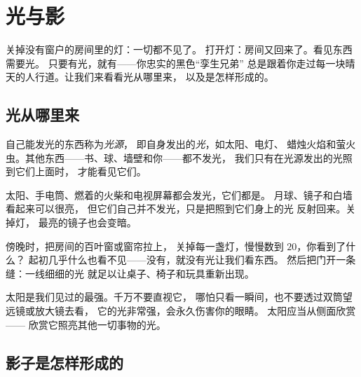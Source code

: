 \chapter{光与影}\label{ch:g1:light-and-shadows}

关掉没有窗户的房间里的灯：一切都不见了。
打开灯：房间又回来了。看见东西需要光。
只要有光，就有——你忠实的黑色“孪生兄弟”
总是跟着你走过每一块晴天的人行道。让我们来看看光从哪里来，
以及是怎样形成的。

\section{光从哪里来}

\begin{definition}[光源]\label{def:g1:light-and-shadows:source}
自己能发光的东西称为\emph{光源}，
即自身发出的\emph{光}，如太阳、电灯、
蜡烛火焰和萤火虫。其他东西——书、球、墙壁和你——都不发光，
我们只有在光源发出的光照到它们上面时，
才能看见它们。
\end{definition}

\begin{example}[是不是光源？]\label{ex:g1:light-and-shadows:sources}
太阳、手电筒、燃着的火柴和电视屏幕都会发光，它们都是。
月球、镜子和白墙看起来可以很亮，
但它们自己并不发光，只是把照到它们身上的光
反射回来。关掉灯，
最亮的镜子也会变暗。
\end{example}

\begin{example}\label{ex:g1:light-and-shadows:darkroom}
傍晚时，把房间的百叶窗或窗帘拉上，
关掉每一盏灯，慢慢数到 $20$，你看到了什么？
起初几乎什么也看不见——没有，就没有光让我们看东西。
然后把门开一条缝：一线细细的光
就足以让桌子、椅子和玩具重新出现。
\end{example}

\begin{remark}[永远不要直视太阳]\label{rem:g1:light-and-shadows:sun}
太阳是我们见过的最强。千万不要直视它，
哪怕只看一瞬间，也不要透过双筒望远镜或放大镜去看，
它的光非常强，会永久伤害你的眼睛。
太阳应当从侧面欣赏——
欣赏它照亮其他一切事物的光。
\end{remark}

\section{影子是怎样形成的}


